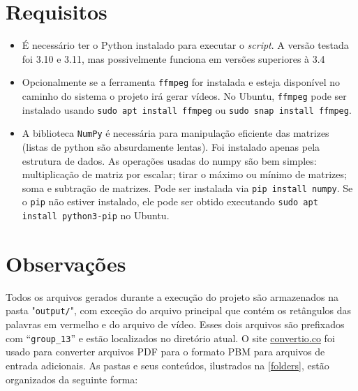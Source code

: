 \documentclass[english, 
               brazil, 
               bsc] %
               {dcomp-abntex2}
\begin{document}
\section{Requisitos} \label{sec-req}
\begin{itemize}
  \item É necessário ter o Python instalado para executar o \textit{script}. A versão testada foi 3.10 e 3.11, mas possivelmente funciona em versões superiores à 3.4
  \item Opcionalmente se a ferramenta \texttt{ffmpeg} for instalada e esteja disponível no caminho do sistema o projeto irá gerar vídeos. No Ubuntu, \texttt{ffmpeg} pode ser instalado usando \texttt{sudo apt install ffmpeg} ou \texttt{sudo snap install ffmpeg}.
  \item A biblioteca \texttt{NumPy} é necessária para manipulação eficiente das matrizes (listas de python são absurdamente lentas). Foi instalado apenas pela estrutura de dados. As operações usadas do numpy são bem simples:  multiplicação de matriz por escalar; tirar o máximo ou mínimo de matrizes; soma e subtração de matrizes. Pode ser instalada via \texttt{pip install numpy}. Se o \texttt{pip} não estiver instalado, ele pode ser obtido executando \texttt{sudo apt install python3-pip} no Ubuntu. \end{itemize}


\section{Observações}

Todos os arquivos gerados durante a execução do projeto são armazenados na pasta "\texttt{output/}", com exceção do arquivo principal que contém os retângulos das palavras em vermelho e do arquivo de vídeo. Esses dois arquivos são prefixados com ``\texttt{group\_13}'' e estão localizados no diretório atual.
O site \href{https://convertio.co/pdf-pbm/}{convertio.co} foi usado para converter arquivos PDF para o formato PBM para arquivos de entrada adicionais. As pastas e seus conteúdos, ilustrados na \autoref{folders}, estão organizados da seguinte forma:
\end{document}
